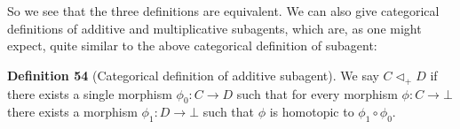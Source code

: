\documentclass{article}
\begin{document}



\noindent So we see that the three definitions are equivalent.
We can also give categorical definitions of additive and multiplicative subagents, which are, as one might expect, quite similar to the above categorical definition of subagent:

\bigskip
\noindent \textbf{Definition 54} (Categorical definition of additive subagent).
We say $C \triangleleft_+ D$ if there exists a single morphism $\phi_0 : C \to D$ such that for every morphism $\phi : C \to \bot$ there exists a morphism $\phi_1: D \to \bot$ such that $\phi$ is homotopic to $\phi_1 \circ \phi_0$.
\end{document}
